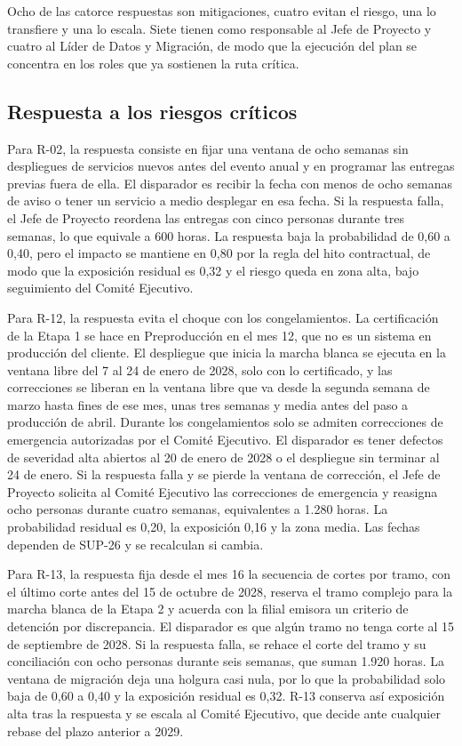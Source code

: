 \documentclass[11pt]{article}
\begin{document}
Ocho de las catorce respuestas son mitigaciones, cuatro evitan el riesgo, una lo transfiere y una lo escala. Siete tienen como responsable al Jefe de Proyecto y cuatro al Líder de Datos y Migración, de modo que la ejecución del plan se concentra en los roles que ya sostienen la ruta crítica.

\subsection{Respuesta a los riesgos críticos}

Para R-02, la respuesta consiste en fijar una ventana de ocho semanas sin despliegues de servicios nuevos antes del evento anual y en programar las entregas previas fuera de ella. El disparador es recibir la fecha con menos de ocho semanas de aviso o tener un servicio a medio desplegar en esa fecha. Si la respuesta falla, el Jefe de Proyecto reordena las entregas con cinco personas durante tres semanas, lo que equivale a 600 horas. La respuesta baja la probabilidad de 0,60 a 0,40, pero el impacto se mantiene en 0,80 por la regla del hito contractual, de modo que la exposición residual es 0,32 y el riesgo queda en zona alta, bajo seguimiento del Comité Ejecutivo.

Para R-12, la respuesta evita el choque con los congelamientos. La certificación de la Etapa 1 se hace en Preproducción en el mes 12, que no es un sistema en producción del cliente. El despliegue que inicia la marcha blanca se ejecuta en la ventana libre del 7 al 24 de enero de 2028, solo con lo certificado, y las correcciones se liberan en la ventana libre que va desde la segunda semana de marzo hasta fines de ese mes, unas tres semanas y media antes del paso a producción de abril. Durante los congelamientos solo se admiten correcciones de emergencia autorizadas por el Comité Ejecutivo. El disparador es tener defectos de severidad alta abiertos al 20 de enero de 2028 o el despliegue sin terminar al 24 de enero. Si la respuesta falla y se pierde la ventana de corrección, el Jefe de Proyecto solicita al Comité Ejecutivo las correcciones de emergencia y reasigna ocho personas durante cuatro semanas, equivalentes a 1.280 horas. La probabilidad residual es 0,20, la exposición 0,16 y la zona media. Las fechas dependen de SUP-26 y se recalculan si cambia.

Para R-13, la respuesta fija desde el mes 16 la secuencia de cortes por tramo, con el último corte antes del 15 de octubre de 2028, reserva el tramo complejo para la marcha blanca de la Etapa 2 y acuerda con la filial emisora un criterio de detención por discrepancia. El disparador es que algún tramo no tenga corte al 15 de septiembre de 2028. Si la respuesta falla, se rehace el corte del tramo y su conciliación con ocho personas durante seis semanas, que suman 1.920 horas. La ventana de migración deja una holgura casi nula, por lo que la probabilidad solo baja de 0,60 a 0,40 y la exposición residual es 0,32. R-13 conserva así exposición alta tras la respuesta y se escala al Comité Ejecutivo, que decide ante cualquier rebase del plazo anterior a 2029.
\end{document}
